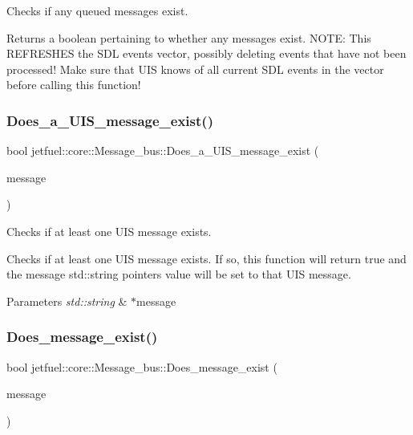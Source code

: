 Checks if any queued messages exist. 

Returns a boolean pertaining to whether any messages exist. N\+O\+TE\+: This R\+E\+F\+R\+E\+S\+H\+ES the S\+DL events vector, possibly deleting events that have not been processed! Make sure that U\+IS knows of all current S\+DL events in the vector before calling this function! \mbox{\label{classjetfuel_1_1core_1_1Message__bus_a0b91a46865f5888bd1c3e2e3bdbc49ee}} 
\subsubsection{\texorpdfstring{Does\+\_\+a\+\_\+\+U\+I\+S\+\_\+message\+\_\+exist()}{Does\_a\_UIS\_message\_exist()}}
{\footnotesize\ttfamily bool jetfuel\+::core\+::\+Message\+\_\+bus\+::\+Does\+\_\+a\+\_\+\+U\+I\+S\+\_\+message\+\_\+exist (\begin{DoxyParamCaption}\item[{std\+::string $\ast$}]{message }\end{DoxyParamCaption})}



Checks if at least one U\+IS message exists. 

Checks if at least one U\+IS message exists. If so, this function will return true and the message std\+::string pointer\textquotesingle{}s value will be set to that U\+IS message.


\begin{DoxyParams}{Parameters}
{\em std\+::string} & $\ast$message \\
\hline
\end{DoxyParams}
\mbox{\label{classjetfuel_1_1core_1_1Message__bus_a9bbbbea3cd97a8f8253e08b700dbd05d}} 
\subsubsection{\texorpdfstring{Does\+\_\+message\+\_\+exist()}{Does\_message\_exist()}}
{\footnotesize\ttfamily bool jetfuel\+::core\+::\+Message\+\_\+bus\+::\+Does\+\_\+message\+\_\+exist (\begin{DoxyParamCaption}\item[{const std\+::string}]{message }\end{DoxyParamCaption})}



